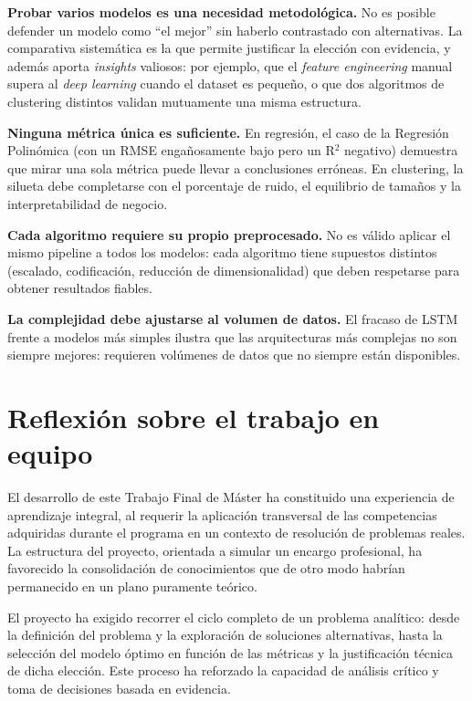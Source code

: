 \documentclass[11pt,a4paper]{article}
\begin{document}
\textbf{Probar varios modelos es una necesidad metodológica.} No es posible defender un modelo como ``el mejor'' sin haberlo contrastado con alternativas. La comparativa sistemática es la que permite justificar la elección con evidencia, y además aporta \textit{insights} valiosos: por ejemplo, que el \textit{feature engineering} manual supera al \textit{deep learning} cuando el dataset es pequeño, o que dos algoritmos de clustering distintos validan mutuamente una misma estructura.

\textbf{Ninguna métrica única es suficiente.} En regresión, el caso de la Regresión Polinómica (con un RMSE engañosamente bajo pero un R$^2$ negativo) demuestra que mirar una sola métrica puede llevar a conclusiones erróneas. En clustering, la silueta debe completarse con el porcentaje de ruido, el equilibrio de tamaños y la interpretabilidad de negocio.

\textbf{Cada algoritmo requiere su propio preprocesado.} No es válido aplicar el mismo pipeline a todos los modelos: cada algoritmo tiene supuestos distintos (escalado, codificación, reducción de dimensionalidad) que deben respetarse para obtener resultados fiables.

\textbf{La complejidad debe ajustarse al volumen de datos.} El fracaso de LSTM frente a modelos más simples ilustra que las arquitecturas más complejas no son siempre mejores: requieren volúmenes de datos que no siempre están disponibles.

\section{Reflexión sobre el trabajo en equipo}

El desarrollo de este Trabajo Final de Máster ha constituido una experiencia de aprendizaje integral, al requerir la aplicación transversal de las competencias adquiridas durante el programa en un contexto de resolución de problemas reales. La estructura del proyecto, orientada a simular un encargo profesional, ha favorecido la consolidación de conocimientos que de otro modo habrían permanecido en un plano puramente teórico.

El proyecto ha exigido recorrer el ciclo completo de un problema analítico: desde la definición del problema y la exploración de soluciones alternativas, hasta la selección del modelo óptimo en función de las métricas y la justificación técnica de dicha elección. Este proceso ha reforzado la capacidad de análisis crítico y toma de decisiones basada en evidencia.
\end{document}
